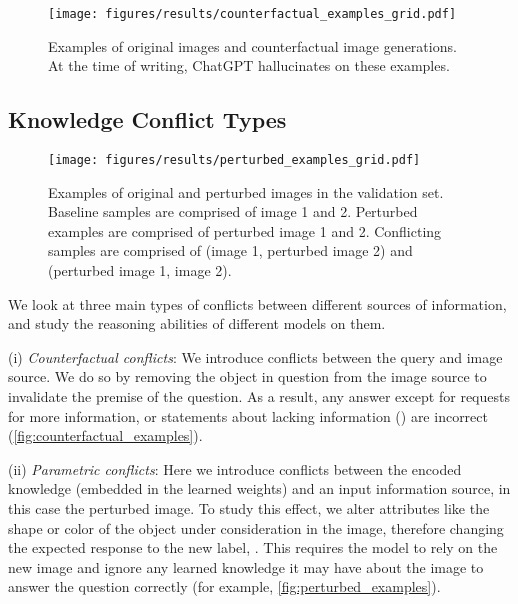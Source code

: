 \begin{figure}
    \centering
    \texttt{[image: figures/results/counterfactual\_examples\_grid.pdf]}
    \caption{Examples of original images and counterfactual image generations. At the time of writing, ChatGPT hallucinates on these examples.}
    \label{fig:counterfactual_examples}
\end{figure}

\subsection{Knowledge Conflict Types}
\label{sec:tasks}

\begin{figure*}
    \centering
    \texttt{[image: figures/results/perturbed\_examples\_grid.pdf]}
    
    \caption{Examples of original and perturbed images in the \segsub validation set. Baseline samples are comprised of image 1 and 2. Perturbed examples are comprised of perturbed image 1 and 2. Conflicting samples are comprised of (image 1, perturbed image 2) and (perturbed image 1, image 2).}
    \label{fig:perturbed_examples}
\end{figure*}

We look at three main types of conflicts between different sources of information, and study the reasoning abilities of different models on them.

\noindent(i) \textit{Counterfactual conflicts}: We introduce conflicts between the query and image source. We do so by removing the object in question from the image source to invalidate the premise of the question. As a result, any answer except for requests for more information, or statements about lacking information (\retlabel) are incorrect (\autoref{fig:counterfactual_examples}). 


\noindent(ii) \textit{Parametric conflicts}: Here we introduce conflicts between the encoded knowledge (embedded in the learned weights) and an input information source, in this case the perturbed image. To study this effect, we alter attributes like the shape or color of the object under consideration in the image, therefore changing the expected response to the new label, \updatedlabel. This requires the model to rely on the new image and ignore any learned knowledge it may have about the image to answer the question correctly (for example, \autoref{fig:perturbed_examples}).
    
